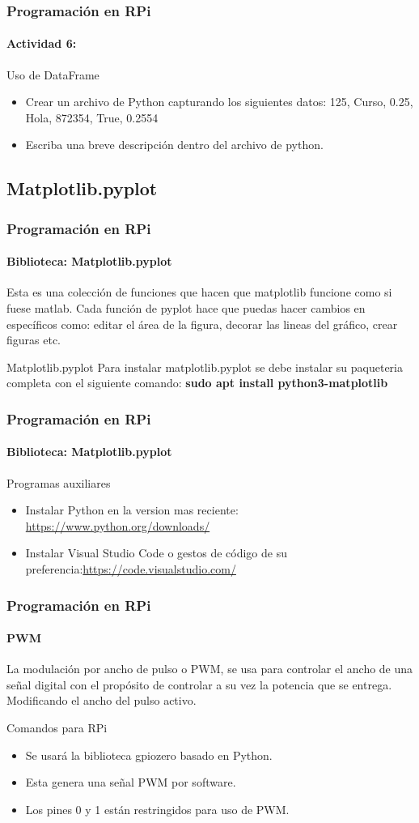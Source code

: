 \documentclass{beamer}
\begin{document}
	\begin{frame}
		\frametitle{Programación en RPi}
	\framesubtitle{Actividad 6:}
	\begin{mybox}{Uso de DataFrame}
		\begin{itemize}
			\item Crear un archivo de Python capturando los siguientes datos: 125, Curso, 0.25, Hola, 872354, True, 0.2554
			\item Escriba una breve descripción dentro del archivo de python.
		\end{itemize}
	\end{mybox}	
	\end{frame}
	\subsection{Matplotlib.pyplot}
	\begin{frame}
		\frametitle{Programación en RPi}
		\framesubtitle{Biblioteca: Matplotlib.pyplot}
		Esta es una colección de funciones que hacen que matplotlib funcione como si fuese matlab. Cada función de pyplot hace que puedas hacer cambios en específicos como: editar el área de la figura, decorar las lineas del gráfico, crear figuras etc.
		\begin{mybox}{Matplotlib.pyplot}
			Para instalar matplotlib.pyplot se debe instalar su paqueteria completa con el siguiente comando: \textbf{sudo apt install python3-matplotlib}
		\end{mybox}
	\end{frame}
	\begin{frame}
		\frametitle{Programación en RPi}
		\framesubtitle{Biblioteca: Matplotlib.pyplot}
		\begin{mybox}{Programas auxiliares}
			\begin{itemize}
				\item Instalar Python en la version mas reciente: \url{https://www.python.org/downloads/}
				\item Instalar Visual Studio Code o gestos de código de su preferencia:\url{https://code.visualstudio.com/} 
			\end{itemize}
		\end{mybox}
	\end{frame}
	\begin{frame}
		\frametitle{Programación en RPi}
		\framesubtitle{PWM}
		La modulación por ancho de pulso o PWM, se usa para controlar el ancho de una señal digital con el propósito de controlar a su vez la potencia que se entrega. Modificando el ancho del pulso activo.
		\begin{mybox}{Comandos para RPi}
			\begin{itemize}
				\item Se usará la biblioteca gpiozero basado en Python.
				\item Esta genera una señal PWM por software.
				\item Los pines 0 y 1 están restringidos para uso de PWM.
			\end{itemize}
		\end{mybox}
	\end{frame}
\end{document}
